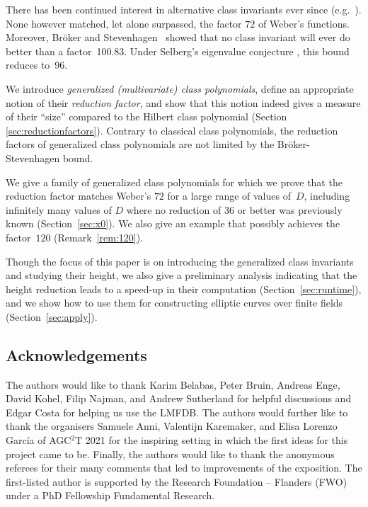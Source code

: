 \documentclass{amsart}
\numberwithin{equation}{section}
\theoremstyle{definition}
\begin{document}
	There has been continued interest in alternative class invariants
	ever since (e.g.~\cite{birch1969,
		schertz1976,
		gee-stevenhagen1998,
		gee1999,
		schertz2002weber,
		enge-morain2002,
		enge-schertz2004,
		enge-schertz2005,
       broker-stevenhagen-constructing,
       enge-sutherland2010,
		enge-schertz2013,
		enge-morain2014}).
	None however matched, let alone surpassed, the factor $72$ of Weber's
	functions.
	Moreover, Br\"oker and Stevenhagen~\cite{broker-stevenhagen-constructing} showed
	that no class invariant will ever do better than a factor~100.83.
	Under Selberg's eigenvalue conjecture \cite[Conjecture~1]{Selberg}, this bound reduces to~96.
	
	We introduce \emph{generalized (multivariate) class polynomials},
	define an appropriate notion of their \emph{reduction factor},
	and show that this notion indeed gives a measure of their ``size''
	compared to the Hilbert class polynomial (Section \ref{sec:reductionfactors}).
	Contrary to classical class polynomials,
	the reduction factors of generalized class polynomials are
	not limited by the Br\"oker-Stevenhagen bound.
	
	We give a family of generalized class polynomials
	for which we prove that the reduction factor matches
	Weber's $72$ for a large range of
	values of~$D$, including infinitely many values of $D$ where
	no reduction of $36$ or better was previously known
	(Section~\ref{sec:x0}).
	We also give an example that possibly 
	achieves the factor~$120$ (Remark~\ref{rem:120}).
	
	Though the focus of this paper is on introducing the generalized class invariants
	and studying their height, we also give a preliminary analysis indicating
    that the height reduction leads to a speed-up in their computation
    (Section~\ref{sec:runtime}),
    and we show how to use them for constructing elliptic curves over finite fields (Section~\ref{sec:apply}).
    
	\subsection*{Acknowledgements}
	
	The authors would like to thank
	Karim Belabas, Peter Bruin, Andreas Enge, David Kohel, Filip Najman, and Andrew Sutherland
	for helpful discussions and Edgar Costa for helping us use the LMFDB.
	The authors would further like to thank the 
	organisers Samuele Anni,
	Valentijn Karemaker, and Elisa Lorenzo Garc\'ia of
	AGC${}^2$T 2021 for the inspiring setting in which the first ideas
	for this project came to be.
	Finally, the authors would like to thank the anonymous referees for their many comments
	that led to improvements of the exposition.
	The first-listed author is supported by the Research Foundation -- Flanders (FWO) under a PhD Fellowship Fundamental Research.
	
\end{document}
